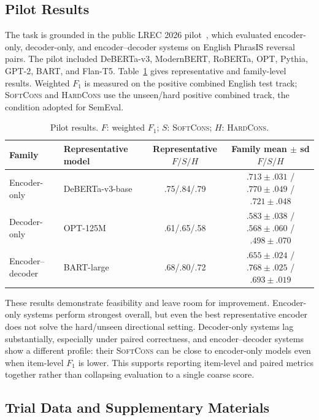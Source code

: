 \documentclass[11pt]{article}
\newcommand{\SoftCons}{\textsc{SoftCons}}
\newcommand{\HardCons}{\textsc{HardCons}}
\begin{document}
\subsection{Pilot Results}

The task is grounded in the public LREC 2026 pilot~\cite{apaolaza2026assessing}, which evaluated encoder-only, decoder-only, and encoder--decoder systems on English PhrasIS reversal pairs.
The pilot included DeBERTa-v3, ModernBERT, RoBERTa, OPT, Pythia, GPT-2, BART, and Flan-T5.
Table~\ref{tab:pilot} gives representative and family-level results.
Weighted $F_1$ is measured on the positive combined English test track; \SoftCons{} and \HardCons{} use the unseen/hard positive combined track, the condition adopted for SemEval.

\begin{table}[t]
\centering
\small
\begin{tabular}{@{}llcc@{}}
\toprule
Family & Representative model & Representative $F/S/H$ & Family mean $\pm$ sd $F/S/H$ \\
\midrule
Encoder-only & DeBERTa-v3-base & .75/.84/.79 & $.713\!\pm\!.031$ / $.770\!\pm\!.049$ / $.721\!\pm\!.048$ \\
Decoder-only & OPT-125M & .61/.65/.58 & $.583\!\pm\!.038$ / $.568\!\pm\!.060$ / $.498\!\pm\!.070$ \\
Encoder--decoder & BART-large & .68/.80/.72 & $.655\!\pm\!.024$ / $.768\!\pm\!.025$ / $.693\!\pm\!.019$ \\
\bottomrule
\end{tabular}
\caption{Pilot results. $F$: weighted $F_1$; $S$: \SoftCons{}; $H$: \HardCons{}.}
\label{tab:pilot}
\end{table}

These results demonstrate feasibility and leave room for improvement.
Encoder-only systems perform strongest overall, but even the best representative encoder does not solve the hard/unseen directional setting.
Decoder-only systems lag substantially, especially under paired correctness, and encoder--decoder systems show a different profile: their \SoftCons{} can be close to encoder-only models even when item-level $F_1$ is lower.
This supports reporting item-level and paired metrics together rather than collapsing evaluation to a single coarse score.

\subsection{Trial Data and Supplementary Materials}
\end{document}
